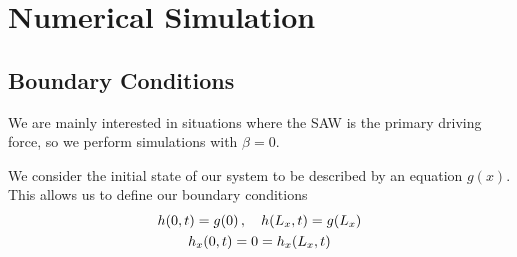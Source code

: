 \section{Numerical Simulation}
\subsection{Boundary Conditions}
\begin{frame}
    We are mainly interested in situations where the SAW is the primary
    driving force, so we perform simulations with $\beta = 0$. 

    We consider the initial state of our system to be described by an equation 
    $g(x)$. This allows us to define our boundary conditions
    \begin{gather*}
        h\!\left( 0,t \right) = g\!\left( 0 \right), \quad h\!\left( L_x, t \right) = g\!\left( L_x \right) \\ 
        h_x\!\left( 0, t \right) = 0 = h_x\!\left( L_x, t \right)
    \end{gather*}
\end{frame}